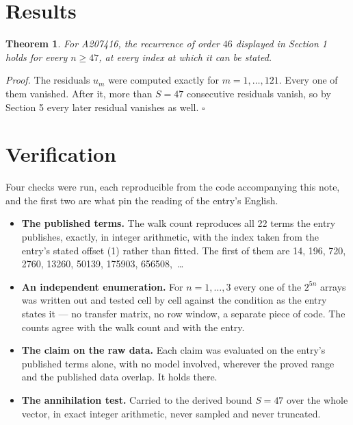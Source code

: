 \documentclass[11pt]{article}
\newtheorem{theorem}{Theorem}
\theoremstyle{definition}
\begin{document}
\section{Results}

\begin{theorem} For A207416, the recurrence of order $46$ displayed in Section 1 holds for every $n \ge 47$, at every index at which it can be stated.\end{theorem}

{\itshape Proof.} The residuals $u_m$ were computed exactly for $m = 1,\dots,121$. Every one of them vanished. After it, more than $S = 47$ consecutive residuals vanish, so by Section 5 every later residual vanishes as well. $\square$

\section{Verification}

Four checks were run, each reproducible from the code accompanying this note, and the first two are what pin the reading of the entry's English.

\begin{itemize}

\item {\bfseries The published terms.} The walk count reproduces all 22 terms the entry publishes, exactly, in integer arithmetic, with the index taken from the entry's stated offset (1) rather than fitted. The first of them are 14, 196, 720, 2760, 13260, 50139, 175903, 656508,~\dots

\item {\bfseries An independent enumeration.} For $n = 1,\dots,3$ every one of the $2^{5n}$ arrays was written out and tested cell by cell against the condition as the entry states it --- no transfer matrix, no row window, a separate piece of code. The counts agree with the walk count and with the entry.

\item {\bfseries The claim on the raw data.} Each claim was evaluated on the entry's published terms alone, with no model involved, wherever the proved range and the published data overlap. It holds there.

\item {\bfseries The annihilation test.} Carried to the derived bound $S = 47$ over the whole vector, in exact integer arithmetic, never sampled and never truncated.

\end{itemize}
\end{document}
